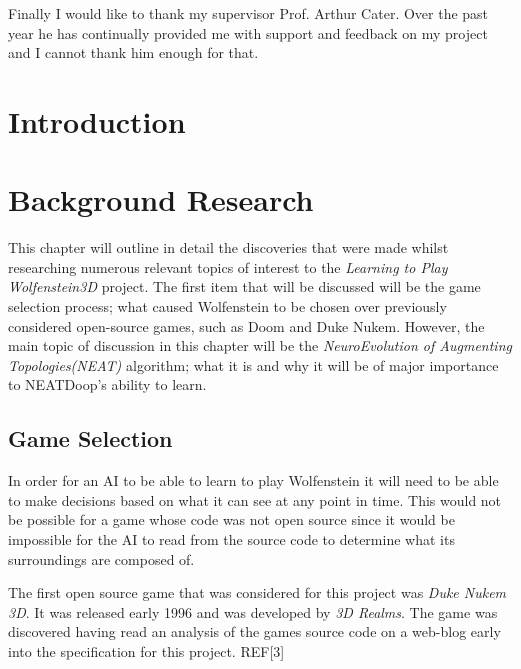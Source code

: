 \documentclass[]{Learning-to-Play-Wolfenstein-thesis}
\begin{document}
Finally I would like to thank my supervisor Prof. Arthur Cater. Over the past year he has continually provided me with support and feedback on my project and I cannot thank him enough for that.

\tableofcontents{}\newpage
\newpage


\chapter{Introduction}

\chapter{Background Research}	%
This chapter will outline in detail the discoveries that were made whilst researching numerous relevant topics of interest to the \textit{Learning to Play Wolfenstein3D} project. The first item that will be discussed will be the game selection process; what caused Wolfenstein to be chosen over previously considered open-source games, such as Doom and Duke Nukem. However, the main topic of discussion in this chapter will be the \textit{NeuroEvolution of Augmenting Topologies(NEAT)} algorithm; what it is and why it will be of major importance to NEATDoop's ability to learn.


\section{Game Selection}
In order for an AI to be able to learn to play Wolfenstein it will need to be able to make decisions based on what it can see at any point in time. This would not be possible for a game whose code was not open source since it would be impossible for the AI to read from the source code to determine what its surroundings are composed of.

The first open source game that was considered for this project was \textit{Duke Nukem 3D}. It was released early 1996 and was developed by \textit{3D Realms}. The game was discovered having read an analysis of the games source code on a web-blog early into the specification for this project. REF[3] 
\end{document}

